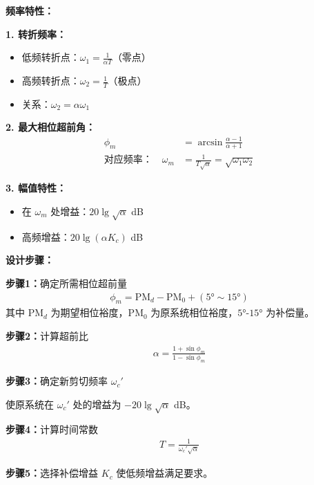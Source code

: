 \begin{minipage}[t]{0.52\textwidth}
\textbf{频率特性：}

\textbf{1. 转折频率：}
\begin{itemize}
    \item 低频转折点：$\omega_1 = \frac{1}{\alpha T}$（零点）
    \item 高频转折点：$\omega_2 = \frac{1}{T}$（极点）
    \item 关系：$\omega_2 = \alpha \omega_1$
\end{itemize}

\textbf{2. 最大相位超前角：}
\begin{align*}
\phi_m &= \arcsin\frac{\alpha - 1}{\alpha + 1} \\
\text{对应频率：} \quad \omega_m &= \frac{1}{T\sqrt{\alpha}} = \sqrt{\omega_1 \omega_2}
\end{align*}

\textbf{3. 幅值特性：}
\begin{itemize}
    \item 在 $\omega_m$ 处增益：$20\lg\sqrt{\alpha}$ dB
    \item 高频增益：$20\lg(\alpha K_c)$ dB
\end{itemize}

\vspace{0.3cm}
\textbf{设计步骤：}

\textbf{步骤1：}确定所需相位超前量
\begin{align*}
\phi_m = \text{PM}_d - \text{PM}_0 + (5° \sim 15°)
\end{align*}
其中 PM$_d$ 为期望相位裕度，PM$_0$ 为原系统相位裕度，$5°$-$15°$ 为补偿量。

\textbf{步骤2：}计算超前比
\begin{align*}
\alpha = \frac{1 + \sin\phi_m}{1 - \sin\phi_m}
\end{align*}

\textbf{步骤3：}确定新剪切频率 $\omega_c'$

使原系统在 $\omega_c'$ 处的增益为 $-20\lg\sqrt{\alpha}$ dB。

\textbf{步骤4：}计算时间常数
\begin{align*}
T = \frac{1}{\omega_c' \sqrt{\alpha}}
\end{align*}

\textbf{步骤5：}选择补偿增益 $K_c$ 使低频增益满足要求。

\end{minipage}\hfill
